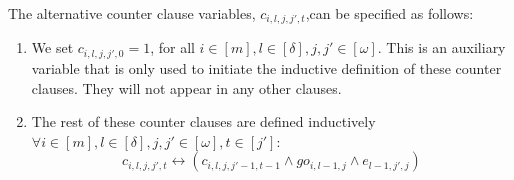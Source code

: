 \begin{itemize}
    The alternative counter clause variables, $c_{i,l,j,j',t}$,can be specified as follows:

     \begin{enumerate}
     
        \item We set $c_{i,l,j,j',0} = 1$, for all $i \in [m], l \in [\delta], j,j' \in [\omega]$. This is an auxiliary variable that is only used to initiate the inductive definition of these counter clauses. They will not appear in any other clauses.
        \item The rest of these counter clauses are defined inductively $\forall i \in [m], l \in [\delta], j,j'\in [\omega], t \in [j']:$
        $$c_{i,l,j,j',t} \leftrightarrow (c_{i,l,j,j'-1,t-1}\land go_{i,l-1,j}\land e_{l-1,j',j})$$
         
     \end{enumerate}
    
    
\end{itemize}

